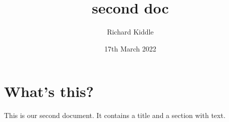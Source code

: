 \documentclass[a4paper,11pt]{article}
\title{second doc}
\author{Richard Kiddle}
\date{17th March 2022}
\begin{document}
\maketitle

\section{What's this?}

This is our second document. It contains a title and a section with text.
\end{document}
